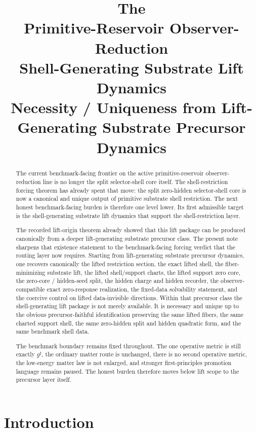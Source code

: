 \documentclass[11pt]{article}
\title{\textbf{The \TheoryName{}}\\[0.4em]
\large Primitive-Reservoir Observer-Reduction\\
\large Shell-Generating Substrate Lift Dynamics\\
\large Necessity / Uniqueness from Lift-Generating Substrate Precursor Dynamics}
\author{}
\date{}
\newcommand{\CompletedMetric}{g^{\sharp}}
\begin{document}
\maketitle

\begin{abstract}
The current benchmark-facing frontier on the active primitive-reservoir observer-reduction line is no longer the split selector-shell core itself. The shell-restriction forcing theorem has already spent that move: the split zero-hidden selector-shell core is now a canonical and unique output of primitive substrate shell restriction. The next honest benchmark-facing burden is therefore one level lower. Its first admissible target is the shell-generating substrate lift dynamics that support the shell-restriction layer.

The recorded lift-origin theorem already showed that this lift package can be produced canonically from a deeper lift-generating substrate precursor class. The present note sharpens that existence statement to the benchmark-facing forcing verdict that the routing layer now requires. Starting from lift-generating substrate precursor dynamics, one recovers canonically the lifted restriction section, the exact lifted shell, the fiber-minimizing substrate lift, the lifted shell/support charts, the lifted support zero core, the zero-core / hidden-seed split, the hidden charge and hidden recorder, the observer-compatible exact zero-response realization, the fixed-data solvability statement, and the coercive control on lifted data-invisible directions. Within that precursor class the shell-generating lift package is not merely available. It is necessary and unique up to the obvious precursor-faithful identification preserving the same lifted fibers, the same charted support shell, the same zero-hidden split and hidden quadratic form, and the same benchmark shell data.

The benchmark boundary remains fixed throughout. The one operative metric is still exactly \(\CompletedMetric\), the ordinary matter route is unchanged, there is no second operative metric, the low-energy matter law is not enlarged, and stronger first-principles promotion language remains paused. The honest burden therefore moves below lift scope to the precursor layer itself.
\end{abstract}

\section{Introduction}
\end{document}
